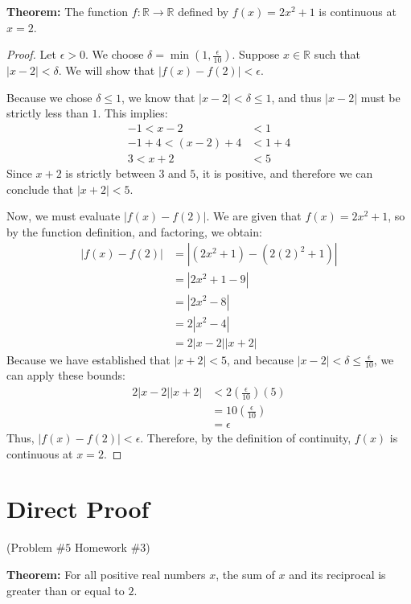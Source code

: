 \documentclass[12pt]{amsart}
\begin{document}
\textbf{Theorem:} The function $f: \mathbb{R} \rightarrow \mathbb{R}$ defined by $f(x) = 2x^2+1$ is continuous at $x=2$.

\begin{proof}
Let $\epsilon > 0$. We choose $\delta = \min\left(1, \frac{\epsilon}{10}\right)$. Suppose $x \in \mathbb{R}$ such that $|x-2| < \delta$. We will show that $|f(x) - f(2)| < \epsilon$.

Because we chose $\delta \le 1$, we know that $|x-2| < \delta \le 1$, and thus $|x-2|$ must be strictly less than $1$. This implies:
\begin{align*}
    -1 < x - 2 &< 1 \\
    -1+4 < (x - 2)+4 &< 1 +4\\
    3 < x + 2 &< 5
\end{align*}
Since $x+2$ is strictly between $3$ and $5$, it is positive, and therefore we can conclude that $|x+2| < 5$.

Now, we must evaluate $|f(x)-f(2)|$. We are given that $f(x)=2x^2+1$, so by the function definition, and factoring, we obtain:
\begin{align*}
    |f(x) - f(2)| &= |(2x^2+1) - (2(2)^2+1)| \\
    &= |2x^2+1-9| \\
    &= |2x^2-8| \\
    &= 2|x^2-4| \\
    &= 2|x-2||x+2| 
\end{align*}
Because we have established that $|x+2| < 5$, and because $|x-2| < \delta \le \frac{\epsilon}{10}$, we can apply these bounds:
\begin{align*}
    2|x-2||x+2| &< 2 \left(\frac{\epsilon}{10}\right) (5) \\
    &= 10 \left(\frac{\epsilon}{10}\right) \\
    &= \epsilon
\end{align*}
Thus, $|f(x) - f(2)| < \epsilon$. Therefore, by the definition of continuity, $f(x)$ is continuous at $x=2$.
\end{proof}

\newpage
\section{Direct Proof}
\begin{center}(Problem $\#5$ Homework $\#3$)\end{center}
\noindent\textbf{Theorem:} For all positive real numbers $x$, the sum of $x$ and its reciprocal is greater than or equal to $2$.
\end{document}
